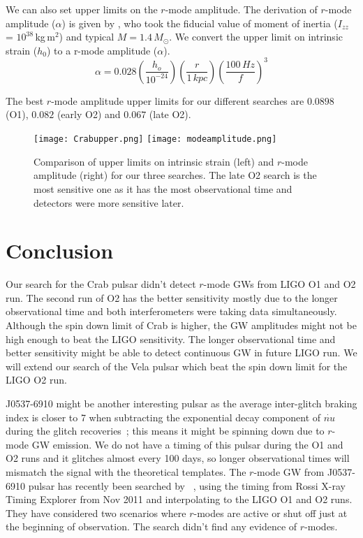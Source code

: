 \documentclass{ttuthes2007}
\begin{document}
We can also set upper limits on the $r$-mode amplitude.  
The derivation of $r$-mode amplitude ($\alpha$) is given by \citet{Owen_2010},
who took the fiducial value of moment of inertia ($I_{zz}$ = $10^{38}$\,kg\,m$^2$)
and typical $M=1.4\,M_\odot$. We convert the upper limit on
intrinsic strain ($h_0$) to a r-mode amplitude ($\alpha$).   
\begin{equation} 
\alpha
=0.028\left(\frac{h_o}{10^{-24}}\right)\left(\frac{r}{1\,kpc}\right)\left(\frac{100\,Hz}{f}\right)^3
\end{equation} 

The best $r$-mode amplitude upper limits for our different searches are $0.0898$
(O1), $0.082$ (early O2) and $0.067$ (late O2). 


\begin{figure}[h!] 
\texttt{[image: Crabupper.png]}
\texttt{[image: modeamplitude.png]}

\caption{Comparison of upper limits on intrinsic strain (left) and $r$-mode
amplitude (right) for our three searches. The late O2 search is the most
sensitive one as it has the most observational
time and detectors were more sensitive later.} 
\label{fig:UL}
\end{figure}


\section{Conclusion} 

Our search for the Crab pulsar didn't detect $r$-mode \acp{GW} from \ac{LIGO}
\ac{O1} and \ac{O2} run. The second run of \ac{O2} has the better sensitivity
mostly due to the longer observational time and both interferometers were taking
data simultaneously. Although the spin down limit of Crab is higher, the \ac{GW}
amplitudes might not be high enough to beat the LIGO sensitivity. The longer
observational time and better sensitivity might be able to detect continuous
\ac{GW} in future LIGO run.  We will extend our search of the Vela pulsar which
beat the spin down limit for the LIGO \ac{O2} run.  

J0537-6910 might be another interesting pulsar as the average inter-glitch
braking index is closer to 7 when subtracting the exponential decay component of
$\dot{nu}$ during the glitch recoveries~\cite{Andersson_2018,Ferdman_2018}; this
means it might be spinning down due to $r$-mode \ac{GW} emission. We do not
have a timing of this pulsar during the \ac{O1} and \ac{O2} runs and it glitches
almost every 100 days, so longer observational times will mismatch the signal
with the theoretical templates. The $r$-mode \ac{GW} from J0537-6910 pulsar has
recently been searched by ~\citet{Fesik2020}, using the timing from Rossi
X-ray Timing Explorer from Nov 2011 and interpolating to the LIGO \ac{O1} and
\ac{O2} runs. They have considered two scenarios where $r$-modes are active or
shut off just at the beginning of observation. The search didn't find any
evidence of $r$-modes.  
\end{document}
